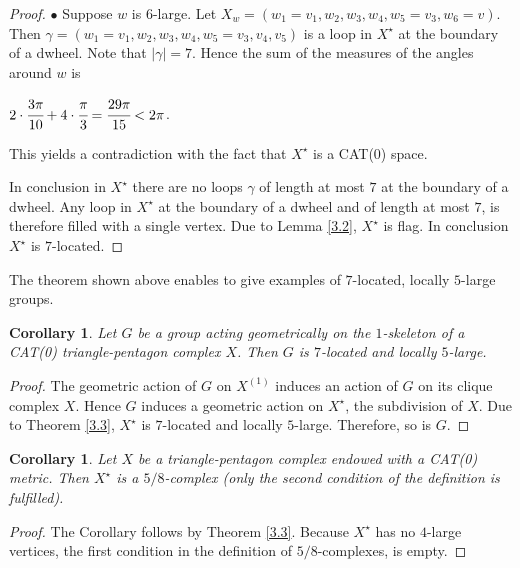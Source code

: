 \documentclass{amsart}
\newtheorem{corollary}[theorem]{Corollary}
\theoremstyle{definition}
\theoremstyle{remark}
\numberwithin{equation}{section}
\begin{document}
\begin{proof}
$\bullet$ Suppose $w$ is $6$-large. Let $X_{w} = (w_{1}=v_{1}, w_{2}, w_{3}, w_{4}, w_{5}=v_{3}, w_{6} = v)$. Then $\gamma =(w_{1}=v_{1}, w_{2}, w_{3}, w_{4}, w_{5} = v_{3}, v_{4}, v_{5})$ is a loop in $X^{\star}$ at the boundary of a dwheel. Note that $|\gamma| = 7$. Hence the sum of the measures of the angles around $w$ is
\begin{center}
$2 \cdot \cfrac{3 \pi}{10} + 4 \cdot \cfrac{\pi}{3} = \cfrac{29 \pi}{15} < 2 \pi$.\end{center} This yields a contradiction with the fact that $X^{\star}$ is a CAT(0) space.

In conclusion in $X^{\star}$ there are no loops $\gamma$ of length at most $7$ at the boundary of a dwheel. Any loop in $X^{\star}$ at the boundary of a dwheel and of length at most $7$, is therefore filled with a single vertex. Due to Lemma \ref{3.2}, $X^{\star}$ is flag. In conclusion $X^{\star}$ is $7$-located.



\end{proof}


The theorem shown above enables to give examples of $7$-located, locally $5$-large groups.

\begin{corollary}\label{3.4}
    Let $G$ be a group acting geometrically on the $1$-skeleton of a CAT(0) triangle-pentagon complex $X$. Then $G$ is $7$-located and locally $5$-large.
\end{corollary}

\begin{proof}

The geometric action of $G$ on $X^{(1)}$ induces an action of $G$ on its clique complex $X$. Hence $G$ induces a geometric action on $X^{\star}$, the subdivision of $X$. Due to Theorem \ref{3.3}, $X^{\star}$ is $7$-located and locally $5$-large. Therefore, so is $G$.

\end{proof}


\begin{corollary}\label{3.5}
Let $X$ be a triangle-pentagon complex endowed with a CAT(0) metric. Then $X^{\star}$ is a $5/8$-complex (only the second condition of the definition is fulfilled).
\end{corollary}

\begin{proof}
The Corollary follows by Theorem \ref{3.3}. Because $X^{\star}$ has no $4$-large vertices, the first condition in the definition of $5/8$-complexes, is empty.
\end{proof}
\end{document}
